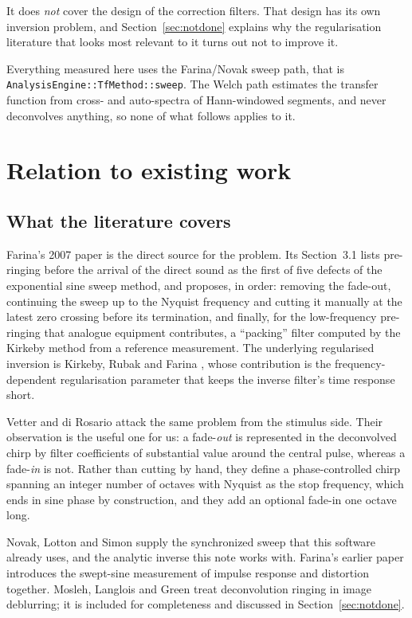 \documentclass[11pt,a4paper]{article}
\newcommand{\code}[1]{\texttt{\small #1}}
\begin{document}
It does \emph{not} cover the design of the correction filters. That design has
its own inversion problem, and Section~\ref{sec:notdone} explains why the
regularisation literature that looks most relevant to it turns out not to
improve it.

Everything measured here uses the Farina/Novak sweep path, that is
\code{AnalysisEngine::}\allowbreak\code{TfMethod::sweep}. The Welch path
estimates the transfer function from cross- and auto-spectra of Hann-windowed
segments, and never deconvolves anything, so none of what follows applies
to it.

\section{Relation to existing work}

\subsection{What the literature covers}

Farina's 2007 paper \cite{Farina2007} is the direct source for the problem. Its
Section~3.1 lists pre-ringing before the arrival of the direct sound as the
first of five defects of the exponential sine sweep method, and proposes, in
order: removing the fade-out, continuing the sweep up to the Nyquist frequency
and cutting it manually at the latest zero crossing before its termination, and
finally, for the low-frequency pre-ringing that analogue equipment contributes,
a ``packing'' filter computed by the Kirkeby method from a reference
measurement. The underlying regularised inversion is
Kirkeby, Rubak and Farina \cite{Kirkeby1998}, whose contribution is the
frequency-dependent regularisation parameter that keeps the inverse filter's
time response short.

Vetter and di Rosario \cite{Vetter2011} attack the same problem from the
stimulus side. Their observation is the useful one for us: a fade-\emph{out} is
represented in the deconvolved chirp by filter coefficients of substantial value
around the central pulse, whereas a fade-\emph{in} is not. Rather than cutting
by hand, they define a phase-controlled chirp spanning an integer number of
octaves with Nyquist as the stop frequency, which ends in sine phase by
construction, and they add an optional fade-in one octave long.

Novak, Lotton and Simon \cite{Novak2015} supply the synchronized sweep that this
software already uses, and the analytic inverse this note works with. Farina's
earlier paper \cite{Farina2000} introduces the swept-sine measurement of impulse
response and distortion together. Mosleh, Langlois and Green \cite{Mosleh2014}
treat deconvolution ringing in image deblurring; it is included for completeness
and discussed in Section~\ref{sec:notdone}.
\end{document}

